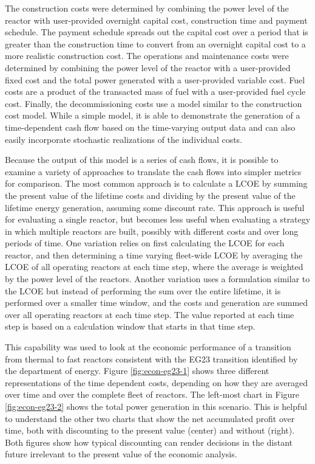 The construction costs were determined by combining the power level of the
reactor with user-provided overnight capital cost, construction time and
payment schedule.  The payment schedule spreads out the capital cost over a
period that is greater than the construction time to convert from an overnight
capital cost to a more realistic construction cost.  The operations and
maintenance costs were determined by combining the power level of the reactor
with a user-provided fixed cost and the total power generated with a
user-provided variable cost.  Fuel costs are a product of the transacted mass
of fuel with a user-provided fuel cycle cost.  Finally, the decommissioning
costs use a model similar to the construction cost model.  While a simple
model, it is able to demonstrate the generation of a time-dependent cash flow
based on the time-varying \Cyclus output data and can also easily incorporate
stochastic realizations of the individual costs.

Because the output of this model is a series of cash flows, it is possible to
examine a variety of approaches to translate the cash flows into simpler
metrics for comparison.  The most common approach is to calculate a \gls{LCOE}
by summing the present value of the lifetime costs and dividing by the present
value of the lifetime energy generation, assuming some discount rate.  This
approach is useful for evaluating a single reactor, but becomes less useful
when evaluating a strategy in which multiple reactors are built, possibly with
different costs and over long periods of time.  One variation relies on first
calculating the \gls{LCOE} for each reactor, and then determining a time
varying fleet-wide \gls{LCOE} by averaging the \gls{LCOE} of all operating
reactors at each time step, where the average is weighted by the power level
of the reactors.  Another variation uses a formulation similar to the
\gls{LCOE} but instead of performing the sum over the entire lifetime, it is
performed over a smaller time window, and the costs and generation are summed
over all operating reactors at each time step.  The value reported at each
time step is based on a calculation window that starts in that time step.

This capability was used to look at the economic performance of a transition
from thermal to fast reactors consistent with the EG23 transition identified
by the department of energy.  Figure \ref{fig:econ-eg23-1} shows three
different representations of the time dependent costs, depending on how they
are averaged over time and over the complete fleet of reactors.  The left-most
chart in Figure \ref{fig:econ-eg23-2} shows the total power generation in this
scenario.  This is helpful to understand the other two charts that show the
net accumulated profit over time, both with discounting to the present value
(center) and without (right).  Both figures show how typical discounting can
render decisions in the distant future irrelevant to the present value of the
economic analysis.

